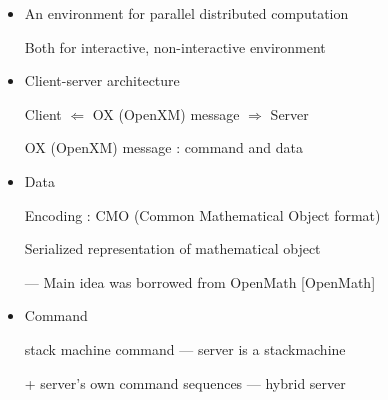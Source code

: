 \setlength{\parskip}{10pt}

\begin{slide}{}
\begin{center}
\end{center}
\end{slide}

\begin{slide}{}

\begin{itemize}
\item An environment for parallel distributed computation

Both for interactive, non-interactive environment

\item Client-server architecture

Client $\Leftarrow$ OX (OpenXM) message $\Rightarrow$ Server

OX (OpenXM) message : command and data

\item Data

Encoding : CMO (Common Mathematical Object format)

Serialized representation of mathematical object

--- Main idea was borrowed from OpenMath [OpenMath]
\item Command

stack machine command --- server is a stackmachine

+ server's own command sequences --- hybrid server
\end{itemize}
\end{slide}


